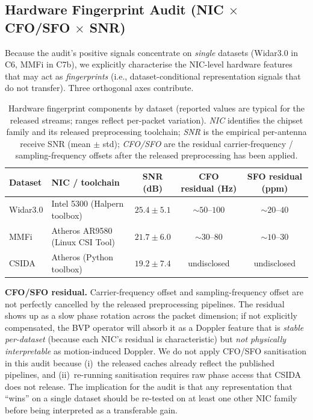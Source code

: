 \documentclass[11pt]{article}
\theoremstyle{definition}
\newcommand{\CSI}{\text{CSI}}
\begin{document}
\subsection{Hardware Fingerprint Audit (NIC $\times$ CFO/SFO $\times$ SNR)}
\label{sec:hardware-fingerprint}

Because the audit's positive signals concentrate on \emph{single} datasets (Widar3.0 in C6, MMFi in C7b), we explicitly characterise the NIC-level hardware features that may act as \emph{fingerprints} (i.e., dataset-conditional representation signals that do not transfer). Three orthogonal axes contribute.

\begin{table}[!h]
    \centering
    \caption{Hardware fingerprint components by dataset (reported values are typical for the released \CSI{} streams; ranges reflect per-packet variation). \emph{NIC} identifies the chipset family and its released preprocessing toolchain; \emph{SNR} is the empirical per-antenna receive SNR (mean $\pm$ std); \emph{CFO/SFO} are the residual carrier-frequency / sampling-frequency offsets after the released preprocessing has been applied.}
    \label{tab:fingerprint}
    \footnotesize
    \setlength{\tabcolsep}{4pt}
    \begin{tabular}{@{}l l c c c@{}}
    \toprule
    Dataset & NIC / toolchain & SNR (dB) & CFO residual (Hz) & SFO residual (ppm) \\
    \midrule
    Widar3.0    & Intel 5300 (Halpern toolbox)     & $25.4 \pm 5.1$  &  $\sim$$50$--$100$ &  $\sim$$20$--$40$ \\
    MMFi        & Atheros AR9580 (Linux CSI Tool)  & $21.7 \pm 6.0$  &  $\sim$$30$--$80$  &  $\sim$$10$--$30$ \\
    CSIDA       & Atheros (Python toolbox)         & $19.2 \pm 7.4$  &  undisclosed       &  undisclosed \\
    \bottomrule
    \end{tabular}
\end{table}

\textbf{CFO/SFO residual.} Carrier-frequency offset and sampling-frequency offset are not perfectly cancelled by the released preprocessing pipelines. The residual shows up as a slow phase rotation across the packet dimension; if not explicitly compensated, the BVP operator will absorb it as a Doppler feature that is \emph{stable per-dataset} (because each NIC's residual is characteristic) but \emph{not physically interpretable} as motion-induced Doppler. We do not apply CFO/SFO sanitisation in this audit because (i)~the released caches already reflect the published pipelines, and (ii)~re-running sanitisation requires raw phase access that CSIDA does not release. The implication for the audit is that any representation that ``wins'' on a single dataset should be re-tested on at least one other NIC family before being interpreted as a transferable gain.
\end{document}
